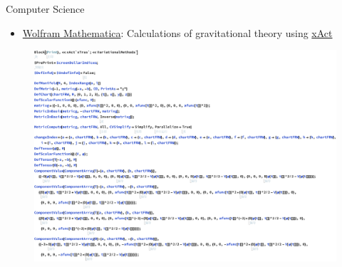 \documentclass[9pt,aspectratio=169,hyperref=colorlinks]{beamer}
\begin{document}
\begin{frame}{Computer Science}
    \begin{itemize}
        \item \href{https://www.wolfram.com/mathematica/}{Wolfram Mathematica}: Calculations of gravitational theory using \href{http://xact.es/index.html}{xAct}
    \end{itemize}

    \begin{figure}
        \centering
        \includegraphics[scale=0.29]{CV/figs/2211.13233.1.pdf}
    \end{figure}
\end{frame}
\end{document}
